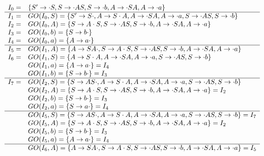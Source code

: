 \begin{enumerate}
\begin{enumerate}
        \begin{equation*}
            \begin{array}{cl}
                I_0 = & \{S' \to \cdot S, S \to \cdot AS, S \to \cdot b, A \to \cdot SA, A \to \cdot a \} \\
                \hline
                I_1 = & GO(I_0, S) = \{S' \to S \cdot, A \to S \cdot A, A \to \cdot SA, A \to \cdot a, S \to \cdot AS, S \to \cdot b\} \\
                I_2 = & GO(I_0, A) = \{S \to A \cdot S, S \to \cdot AS, S \to \cdot b, A \to \cdot SA, A \to \cdot a \} \\
                I_3 = & GO(I_0, b) = \{S \to b \cdot \} \\
                I_4 = & GO(I_0, a) = \{A \to a \cdot \} \\
                \hline
                I_5 = & GO(I_1, A) = \{A \to SA \cdot, S \to A \cdot S, S \to \cdot AS, S \to \cdot b, A \to \cdot SA, A \to \cdot a \} \\
                I_6 = & GO(I_1, S) = \{A \to S \cdot A, A \to \cdot SA, A \to \cdot a, S \to \cdot AS, S \to \cdot b\} \\
                    & GO(I_1, a) = \{A \to a \cdot \} = I_4 \\
                    & GO(I_1, b) = \{S \to b \cdot\} = I_3 \\
                \hline
                I_7 = & GO(I_2, S) = \{S \to AS \cdot, A \to S \cdot A, A \to \cdot SA, A \to \cdot a, S \to \cdot AS, S \to \cdot b \} \\
                    & GO(I_2, A) = \{S \to A \cdot S, S \to \cdot AS, S \to \cdot b, A \to \cdot SA, A \to \cdot a \} = I_2 \\
                    & GO(I_2, b) = \{S \to b \cdot \} = I_3 \\
                    & GO(I_2, a) = \{S \to a \cdot \} = I_4 \\
                \hline
                    & GO(I_5, S) = \{S \to AS \cdot, A \to S \cdot A, A \to \cdot SA, A \to \cdot a, S \to \cdot AS, S \to \cdot b\} = I_7 \\
                    & GO(I_5, A) = \{S \to A \cdot S, S \to \cdot AS, S \to \cdot b, A \to \cdot SA, A \to \cdot a\} = I_2 \\
                    & GO(I_5, b) = \{S \to b \cdot\} = I_3 \\
                    & GO(I_5, a) = \{A \to a \cdot\} = I_4 \\
                \hline
                    & GO(I_6, A) = \{A \to SA \cdot, S \to A \cdot S, S \to \cdot AS, S \to \cdot b, A \to \cdot SA, A \to \cdot a \} = I_5 \\

\end{array}
\end{equation*}
\end{enumerate}
\end{enumerate}
